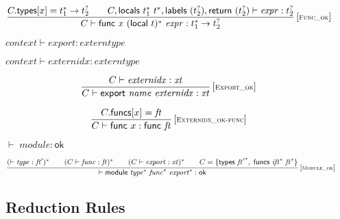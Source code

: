 \documentclass{article}
\begin{document}
$$
\begin{array}{@{}c@{}}\displaystyle
	\frac{
		C{.}\mathsf{types}{}[x] = {t_1^\ast} \rightarrow {t_2^?}
		\qquad
		C, \mathsf{locals}~{t_1^\ast}~{t^\ast}, \mathsf{labels}~({t_2^?}), \mathsf{return}~({t_2^?}) \vdash {\mathit{expr}} : {t_2^?}
	}{
		C \vdash \mathsf{func}~x~{(\mathsf{local}~t)^\ast}~{\mathit{expr}} : {t_1^\ast} \rightarrow {t_2^?}
	} \, {[\textsc{\scriptsize Func\_ok}]}
	\qquad
\end{array}
$$

\vspace{1ex}

$\boxed{{\mathit{context}} \vdash {\mathit{export}} : {\mathit{externtype}}}$

$\boxed{{\mathit{context}} \vdash {\mathit{externidx}} : {\mathit{externtype}}}$

$$
\begin{array}{@{}c@{}}\displaystyle
	\frac{
		C \vdash {\mathit{externidx}} : {\mathit{xt}}
	}{
		C \vdash \mathsf{export}~{\mathit{name}}~{\mathit{externidx}} : {\mathit{xt}}
	} \, {[\textsc{\scriptsize Export\_ok}]}
	\qquad
\end{array}
$$

\vspace{1ex}

$$
\begin{array}{@{}c@{}}\displaystyle
	\frac{
		C{.}\mathsf{funcs}{}[x] = {\mathit{ft}}
	}{
		C \vdash \mathsf{func}~x : \mathsf{func}~{\mathit{ft}}
	} \, {[\textsc{\scriptsize Externidx\_ok{-}func}]}
	\qquad
\end{array}
$$

\vspace{1ex}

$\boxed{{ \vdash }\;{\mathit{module}} : \mathsf{ok}}$

$$
\begin{array}{@{}c@{}}\displaystyle
	\frac{
		({ \vdash }\;{\mathit{type}} : {\mathit{ft}'})^\ast
		\qquad
		(C \vdash {\mathit{func}} : {\mathit{ft}})^\ast
		\qquad
		(C \vdash {\mathit{export}} : {\mathit{xt}})^\ast
		\qquad
		C = \{ \begin{array}[t]{@{}l@{}}
			\mathsf{types}~{{\mathit{ft}'}^\ast},\; \mathsf{funcs}~{{\mathit{ift}}^\ast}~{{\mathit{ft}}^\ast} \}\end{array}
	}{
		{ \vdash }\;\mathsf{module}~{{\mathit{type}}^\ast}~{{\mathit{func}}^\ast}~{{\mathit{export}}^\ast} : \mathsf{ok}
	} \, {[\textsc{\scriptsize Module\_ok}]}
	\qquad
\end{array}
$$
\subsection{Reduction Rules}
\end{document}
